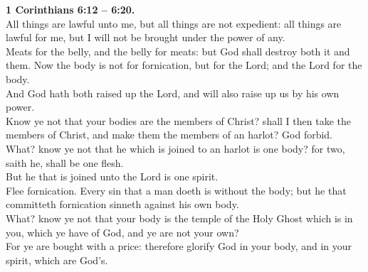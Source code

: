 \documentclass[10pt]{article} %
\begin{document}
{\begin{minipage}[t]{0.45\textwidth}
\textbf{1 Corinthians 6:12 -- 6:20.}\\
All things are lawful unto me, but all things are not expedient: all things are lawful for me, but I will not be brought under the power of any.\\
Meats for the belly, and the belly for meats: but God shall destroy both it and them. Now the body is not for fornication, but for the Lord; and the Lord for the body.\\
And God hath both raised up the Lord, and will also raise up us by his own power.\\
Know ye not that your bodies are the members of Christ? shall I then take the members of Christ, and make them the members of an harlot? God forbid.\\
What? know ye not that he which is joined to an harlot is one body? for two, saith he, shall be one flesh.\\
But he that is joined unto the Lord is one spirit.\\
Flee fornication. Every sin that a man doeth is without the body; but he that committeth fornication sinneth against his own body.\\
What? know ye not that your body is the temple of the Holy Ghost which is in you, which ye have of God, and ye are not your own?\\
For ye are bought with a price: therefore glorify God in your body, and in your spirit, which are God's.\\

\end{minipage}}
\vspace*{\fill}
\newpage
\Huge%
\vspace*{\fill}
\begin{spacing}{1.0}%
\end{spacing}
\vspace*{\fill}
\end{document}
